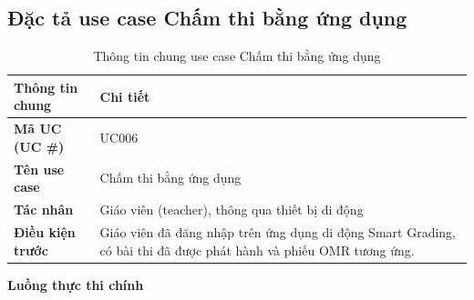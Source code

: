 \subsection{Đặc tả use case Chấm thi bằng ứng dụng}
\label{subsection:2.3.6}

\begin{table}[htbp]
\centering
\begin{tabular}{|p{4cm}|p{10cm}|}
\hline
\textbf{Thông tin chung} & \textbf{Chi tiết} \\ \hline
\textbf{Mã UC (UC \#)} & UC006 \\ \hline
\textbf{Tên use case} & Chấm thi bằng ứng dụng \\ \hline
\textbf{Tác nhân} & Giáo viên (teacher), thông qua thiết bị di động \\ \hline
\textbf{Điều kiện trước} & Giáo viên đã đăng nhập trên ứng dụng di động Smart Grading, có bài thi đã được phát hành và phiếu OMR tương ứng. \\ \hline
\end{tabular}
\caption{Thông tin chung use case Chấm thi bằng ứng dụng}
\label{table:2.3.6_info}
\end{table}

\noindent\textbf{Luồng thực thi chính}

